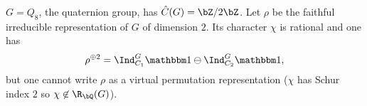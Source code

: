  \begin{example}
    $G = Q_8$, the quaternion group, has $\C(G) = \bZ / 2 \bZ$. Let $\rho$ be the faithful irreducible representation of $G$ of dimension $2$. Its character $\chi$ is rational and one has 
    \[ \rho^{\oplus 2} = \Ind_{C_1}^G \trivial \ominus \Ind_{C_2}^G \trivial, \]
    but one cannot write $\rho$ as a virtual permutation representation ($\chi$ has Schur index $2$ so $\chi \not\in \R_{\bQ}(G)$).  
 \end{example}


